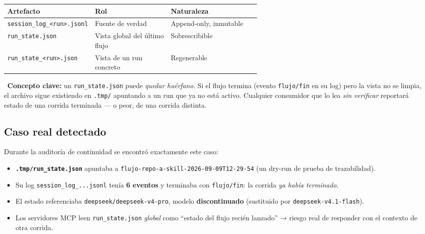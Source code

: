 \documentclass[11pt,a4paper]{article}
\begin{document}
\begin{center}
\begin{tabularx}{\linewidth}{>{\raggedright\arraybackslash}p{0.30\linewidth} p{0.30\linewidth} X}
\toprule
\textbf{Artefacto} & \textbf{Rol} & \textbf{Naturaleza} \\
\midrule
\texttt{session\_log\_<run>.jsonl} & Fuente de verdad & Append-only, inmutable \\
\texttt{run\_state.json} & Vista global del último flujo & Sobrescribible \\
\texttt{run\_state\_<run>.json} & Vista de un run concreto & Regenerable \\
\bottomrule
\end{tabularx}
\end{center}

\begin{cajaConcepto}
~\textbf{Concepto clave:} un \texttt{run\_state.json} puede
\emph{quedar huérfano}. Si el flujo termina (evento \texttt{flujo/fin} en su log) pero
la vista no se limpia, el archivo sigue existiendo en \texttt{.tmp/} apuntando a un run
que ya no está activo. Cualquier consumidor que lo lea \emph{sin verificar} reportará
estado de una corrida terminada — o peor, de una corrida distinta.
\end{cajaConcepto}

\subsection{Caso real detectado}
Durante la auditoría de continuidad se encontró exactamente este caso:

\begin{tcolorbox}[cajaMejora, title=Caso de estudio --- vista huérfana de un dry-run]
\begin{itemize}%
  \item \textbf{\texttt{.tmp/run\_state.json}} apuntaba a
        \texttt{flujo-repo-a-skill-2026-09-09T12-29-54} (un dry-run de prueba de
        trazabilidad).
  \item Su log \texttt{session\_log\_...jsonl} tenía \textbf{6 eventos} y terminaba con
        \texttt{flujo/fin}: la corrida \emph{ya había terminado}.
  \item El estado referenciaba \texttt{deepseek/deepseek-v4-pro}, modelo
        \textbf{discontinuado} (sustituido por \texttt{deepseek-v4.1-flash}).
  \item Los servidores MCP leen \texttt{run\_state.json} \emph{global} como
        ``estado del flujo recién lanzado'' → riesgo real de responder con el contexto
        de otra corrida.
\end{itemize}
\end{tcolorbox}
\end{document}
